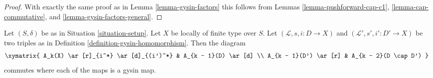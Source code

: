 \begin{proof}
With exactly the same proof as in Lemma \ref{lemma-gysin-factors}
this follows from Lemmas
\ref{lemma-pushforward-cap-c1},
\ref{lemma-cap-commutative}, and
\ref{lemma-gysin-factors-general}.
\end{proof}

\begin{lemma}
\label{lemma-gysin-commutes-gysin}
Let $(S, \delta)$ be as in Situation \ref{situation-setup}. Let $X$ be locally
of finite type over $S$. Let $(\mathcal{L}, s, i : D \to X)$ and
$(\mathcal{L}', s', i' : D' \to X)$ be two triples as in
Definition \ref{definition-gysin-homomorphism}. Then the diagram
$$
\xymatrix{
A_k(X) \ar[r]_{i^*} \ar[d]_{(i')^*} & A_{k - 1}(D) \ar[d] \\
A_{k - 1}(D') \ar[r] & A_{k - 2}(D \cap D')
}
$$
commutes where each of the maps is a gysin map.
\end{lemma}

